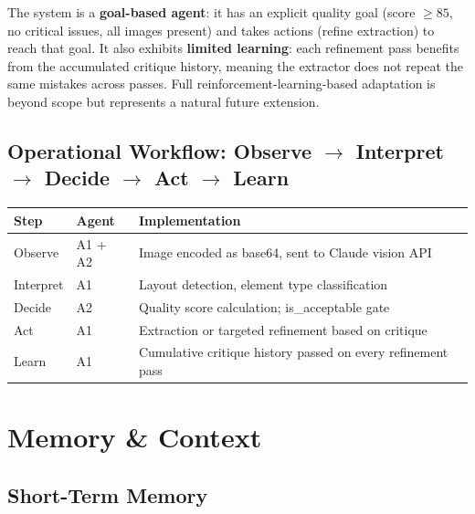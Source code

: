 \documentclass[12pt,a4paper]{article}
\begin{document}
The system is a \textbf{goal-based agent}: it has an explicit quality goal (score $\geq 85$,
no critical issues, all images present) and takes actions (refine extraction) to reach that
goal. It also exhibits \textbf{limited learning}: each refinement pass benefits from the
accumulated critique history, meaning the extractor does not repeat the same mistakes across
passes. Full reinforcement-learning-based adaptation is beyond scope but represents a natural
future extension.

\subsection{Operational Workflow: Observe $\rightarrow$ Interpret $\rightarrow$ Decide $\rightarrow$ Act $\rightarrow$ Learn}

\begin{center}
\begin{tabular}{lll}
  \toprule
  \textbf{Step} & \textbf{Agent} & \textbf{Implementation} \\
  \midrule
  Observe    & A1 + A2 & Image encoded as base64, sent to Claude vision API \\
  Interpret  & A1      & Layout detection, element type classification \\
  Decide     & A2      & Quality score calculation; is\_acceptable gate \\
  Act        & A1      & Extraction or targeted refinement based on critique \\
  Learn      & A1      & Cumulative critique history passed on every refinement pass \\
  \bottomrule
\end{tabular}
\end{center}


\section{Memory \& Context}

\subsection{Short-Term Memory}
\end{document}
